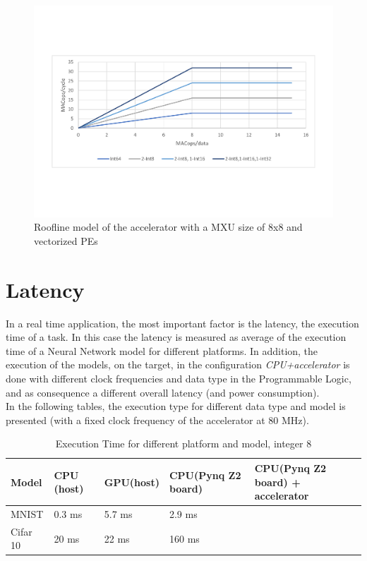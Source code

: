 \begin{figure}[!htbp]
\centering
\captionsetup{justification=centering}
\includegraphics[scale=0.45,angle=0]{./figure/graphs/roofline_vectorized.pdf}
\caption{Roofline model of the accelerator with a MXU size of 8x8 and vectorized PEs}
\label{fig:rooflinevect}
\end{figure}
 \newpage
 
\section{Latency}
In a real time application, the most important factor is the latency, the execution time of a task.
In this case the latency is measured as average of the execution time of a Neural Network model for different platforms. In addition, the execution of the models, on the target, in the configuration \textit{CPU+accelerator} is done with different clock frequencies and data type in the Programmable Logic, and as consequence a different overall latency (and power consumption).\\
In the following tables, the execution type for different data type and model is presented (with a fixed clock frequency of the accelerator at 80 MHz).
\begin{center}
\begin{table}[!htbp]
\centering
\captionsetup{justification=centering}
\begin{tabular}{ |p{2.5cm}||p{2.5cm}|p{2.5cm}|p{2.5cm}|p{2.5cm}| }
\hline
Model & CPU (host)\protect\footnotemark[1] & GPU(host)\protect\footnotemark[2] & CPU(Pynq Z2 board)\protect\footnotemark[3] & CPU(Pynq Z2 board) + accelerator \\
\hline
MNIST & 0.3 ms & 5.7 ms & 2.9 ms  & \\
\hline
Cifar 10& 20 ms & 22 ms& 160 ms &\\
\hline
\end{tabular}
\caption{Execution Time for different platform and model, integer 8}
\label{table:moplatint8}
\end{table}
\end{center}

